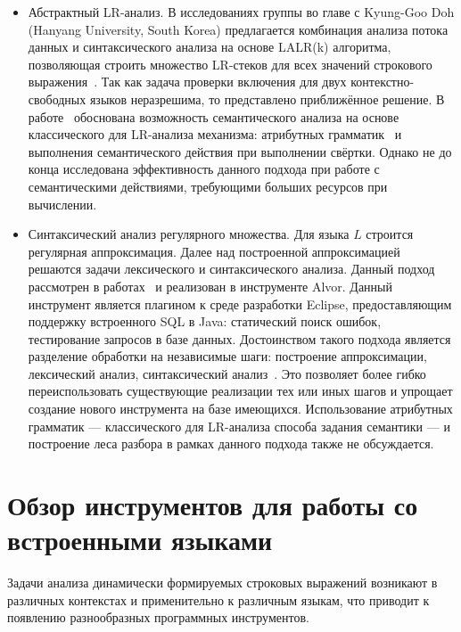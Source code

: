 \begin{itemize}
    \item Абстрактный LR-анализ. В исследованиях группы во главе  с Kyung-Goo Doh (Hanyang University, South Korea) предлагается комбинация анализа потока данных и синтаксического анализа на основе LALR(k) алгоритма, позволяющая строить множество LR-стеков для всех значений строкового выражения~\cite{LrAbstract1, LrAbstract2, LRAbstractParsingSema}. Так как задача проверки включения для двух контекстно-свободных языков неразрешима, то представлено приближённое решение. В работе~\cite{LRAbstractParsingSema} обоснована возможность семантического анализа на основе классического для LR-анализа механизма: атрибутных грамматик~\cite{Dragon} и выполнения семантического действия при выполнении свёртки. Однако не до конца исследована эффективность данного подхода при работе с семантическими действиями, требующими больших ресурсов при вычислении.

    \item Синтаксический анализ регулярного множества. Для языка $L$ строится регулярная аппроксимация. Далее над построенной аппроксимацией решаются задачи лексического и синтаксического анализа. Данный подход рассмотрен в работах~\cite{Alvor1, Alvor2} и реализован в инструменте Alvor. Данный инструмент является плагином к среде разработки Eclipse, предоставляющим поддержку встроенного SQL в Java: статический поиск ошибок, тестирование запросов в базе данных. Достоинством такого подхода является разделение обработки на независимые шаги: построение аппроксимации, лексический анализ, синтаксический анализ~\cite{Alvor2}. Это позволяет более гибко переиспользовать существующие реализации тех или иных шагов и упрощает создание нового инструмента на базе имеющихся. Использование атрибутных грамматик --- классического для LR-анализа способа задания семантики --- и построение леса разбора в рамках данного подхода также не обсуждается.

\end{itemize}


\section{Обзор инструментов для работы со встроенными языками}\label{SELToolsDescr}

    Задачи анализа динамически формируемых строковых выражений возникают в различных контекстах и применительно к различным языкам, что приводит к появлению разнообразных программных инструментов.

